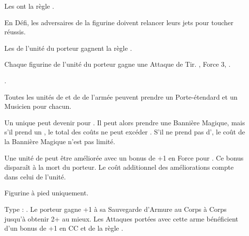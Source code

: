 \begin{multicols}{2}
\endpricelistNSP
\closearmynewsection

\vspace*{\fill}
\columnbreak

\startarmynewsection{\aspectsofnature}

\spaceaftersection{}

Les \aspectsofnature{} ont la règle \oneperarmy{}.

\startpricelistNSP

 En Défi, les adversaires de la figurine doivent relancer leurs jets pour toucher réussis.

 Les \dryads{} de l'unité du porteur gagnent la règle \hatred{}.

 Chaque figurine de l'unité du porteur gagne une Attaque de Tir. , Force 3, .

 .

Toutes les unités de \dryads{} et de \thicketbeasts{} de l'armée peuvent prendre un Porte-étendard et un Musicien pour  chacun.

Un unique \thicketshepherd{} peut devenir \bsb{} pour . Il peut alors prendre une Bannière Magique, mais s'il prend un \aspectofnature{}, le total des coûts ne peut excéder . S'il ne prend pas d'\aspectofnature{}, le coût de la Bannière Magique n'est pas limité.

 Une unité de \thicketbeasts{} peut être améliorée avec un bonus de +1 en Force pour \permodel{}. Ce bonus disparaît à la mort du porteur. Le coût additionnel des améliorations compte dans celui de l'unité.

\endpricelistNSP
\closearmynewsection

\vspace*{\fill}
\end{multicols}







\startarmymagicalitems

\armymagicalweapons

\startpricelist

Figurine à pied uniquement.

Type : \gw{}. Le porteur gagne +1 à sa Sauvegarde d'Armure au Corps à Corps jusqu'à obtenir 2+ au mieux. Les Attaques portées avec cette arme bénéficient d'un bonus de +1 en CC et de la règle .

